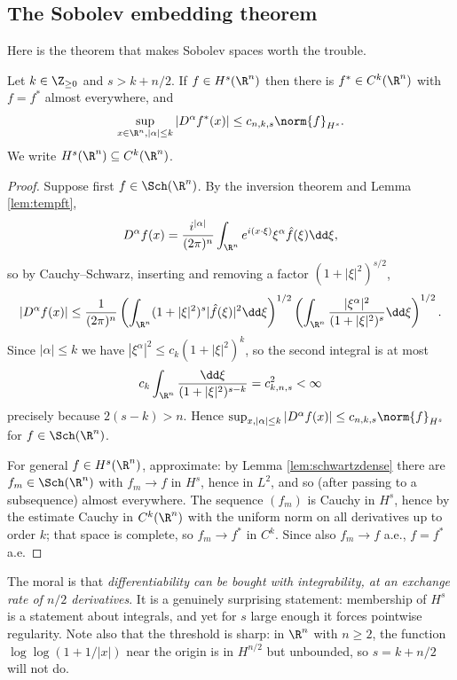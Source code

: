\subsection{The Sobolev embedding theorem}

Here is the theorem that makes Sobolev spaces worth the trouble.

\begin{theorem}\label{thm:sobolevembed}
	Let $k\in\Z_{\ge0}$ and $s > k + n/2$. If $f \in H^s(\R^n)$ then there is $f^*\in C^k(\R^n)$ with $f = f^*$ almost everywhere, and
	$$\sup_{x\in\R^n,|\alpha|\le k}|D^\alpha f^*(x)|\le c_{n,k,s}\norm{f}_{H^s}.$$
	We write $H^s(\R^n)\subseteq C^k(\R^n)$.
\end{theorem}

\begin{proof}
	Suppose first $f\in\Sch(\R^n)$. By the inversion theorem and Lemma \ref{lem:tempft},
	$$D^\alpha f(x)=\frac{i^{|\alpha|}}{(2\pi)^n}\int_{\R^n}e^{i(x\cdot\xi)}\xi^\alpha\hat f(\xi)\dd\xi,$$
	so by Cauchy--Schwarz, inserting and removing a factor $(1+|\xi|^2)^{s/2}$,
	$$|D^\alpha f(x)|\le\frac{1}{(2\pi)^n}\left(\int_{\R^n}(1+|\xi|^2)^s|\hat f(\xi)|^2\dd\xi\right)^{1/2}\left(\int_{\R^n}\frac{|\xi^\alpha|^2}{(1+|\xi|^2)^s}\dd\xi\right)^{1/2}.$$
	Since $|\alpha|\le k$ we have $|\xi^\alpha|^2\le c_k(1+|\xi|^2)^k$, so the second integral is at most
	$$c_k\int_{\R^n}\frac{\dd\xi}{(1+|\xi|^2)^{s-k}}=c^2_{k,n,s}<\infty$$
	precisely because $2(s-k)>n$. Hence $\sup_{x,|\alpha|\le k}|D^\alpha f(x)|\le c_{n,k,s}\norm{f}_{H^s}$ for $f\in\Sch(\R^n)$.

	For general $f \in H^s(\R^n)$, approximate: by Lemma \ref{lem:schwartzdense} there are $f_m\in\Sch(\R^n)$ with $f_m\to f$ in $H^s$, hence in $L^2$, and so (after passing to a subsequence) almost everywhere. The sequence $(f_m)$ is Cauchy in $H^s$, hence by the estimate Cauchy in $C^k(\R^n)$ with the uniform norm on all derivatives up to order $k$; that space is complete, so $f_m\to f^*$ in $C^k$. Since also $f_m\to f$ a.e., $f = f^*$ a.e.
\end{proof}

The moral is that \emph{differentiability can be bought with integrability, at an exchange rate of $n/2$ derivatives}. It is a genuinely surprising statement: membership of $H^s$ is a statement about integrals, and yet for $s$ large enough it forces pointwise regularity. Note also that the threshold is sharp: in $\R^n$ with $n \ge 2$, the function $\log\log(1+1/|x|)$ near the origin is in $H^{n/2}$ but unbounded, so $s = k+n/2$ will not do.

